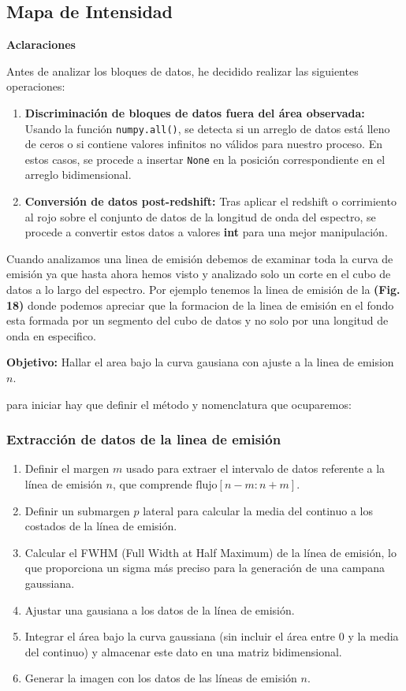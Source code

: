 \documentclass[10pt,twocolumn,a4paper]{opticajnl}
\begin{document}
\subsection*{Mapa de Intensidad}

\textbf{Aclaraciones}

Antes de analizar los bloques de datos, he decidido realizar las siguientes operaciones:

\begin{enumerate}
\item \textbf{Discriminación de bloques de datos fuera del área observada:} Usando la función \texttt{numpy.all()}, se detecta si un arreglo de datos está lleno de ceros o si contiene valores infinitos no válidos para nuestro proceso. En estos casos, se procede a insertar \texttt{None} en la posición correspondiente en el arreglo bidimensional.
\item \textbf{Conversión de datos post-redshift:} Tras aplicar el redshift o corrimiento al rojo sobre el conjunto de datos de la longitud de onda del espectro, se procede a convertir estos datos a valores \textbf{int} para una mejor manipulación.
\end{enumerate}

Cuando analizamos una linea de emisión debemos de examinar toda la curva de emisión ya que hasta ahora hemos visto y analizado solo un corte en el cubo de datos a lo largo del espectro. Por ejemplo tenemos la linea de emisión de la \textbf{(Fig. 18)} donde podemos apreciar que la formacion de la linea de emisión en el fondo esta formada por un segmento del cubo de datos y no solo por una longitud de onda en especifico.

\textbf{Objetivo: } Hallar el area bajo la curva gausiana con ajuste a la linea de emision $n$. 

para iniciar hay que definir el método y nomenclatura que ocuparemos:
\subsubsection*{Extracción de datos de la linea de emisión}

\begin{enumerate}
  \item Definir el margen \( m \) usado para extraer el intervalo de datos referente a la línea de emisión \( n \), que comprende \( \text{flujo}[n-m:n+m] \).
  \item Definir un submargen \( p \) lateral para calcular la media del continuo a los costados de la línea de emisión.
  \item Calcular el FWHM (Full Width at Half Maximum) de la línea de emisión, lo que proporciona un sigma más preciso para la generación de una campana gaussiana.
  \item Ajustar una gausiana a los datos de la línea de emisión.
  \item Integrar el área bajo la curva gaussiana (sin incluir el área entre 0 y la media del continuo) y almacenar este dato en una matriz bidimensional.
  \item Generar la imagen con los datos de las líneas de emisión \( n \).
\end{enumerate}
\end{document}
